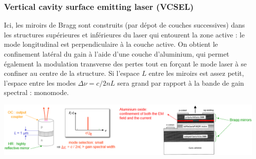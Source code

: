 \subsubsection{Vertical cavity surface emitting laser (VCSEL)}
Ici, les miroirs de Bragg sont construits (par dépot de couches successives) dans les structures
supérieures et inférieures du laser qui entourent la zone active : le mode longitudinal est
perpendiculaire à la couche active. On obtient le confinement latéral du gain à l'aide d'une couche
d'aluminium, qui permet également  la modulation transverse des pertes tout en forçant le mode laser à
se confiner au centre de la structure. Si l'espace $L$ entre les miroirs est assez petit, l'espace entre
les modes $\Delta \nu = c/2nL$ sera grand par rapport à la bande de gain spectral : monomode.
\begin{center}
	\includegraphics[scale=0.55]{ch4/image22}
\end{center}





